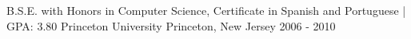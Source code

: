 

\begin{cventries}

  \cventry
    {B.S.E. with Honors in Computer Science, Certificate in Spanish and Portuguese | GPA: 3.80} %
    {Princeton University} %
    {Princeton, New Jersey} %
    {2006 - 2010} %
    { }
    
    \vspace*{-12pt} 

\end{cventries}
